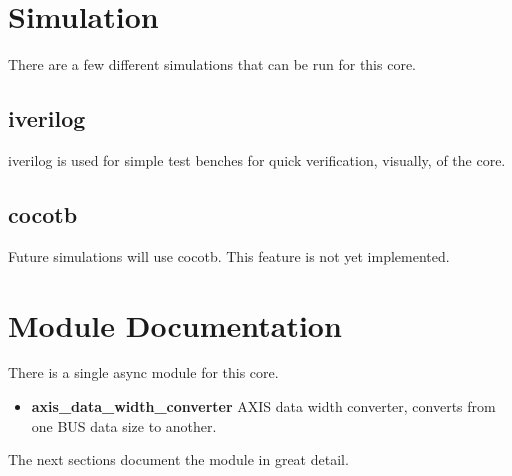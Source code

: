 \newpage

\section{Simulation}
\par
There are a few different simulations that can be run for this core.

\subsection{iverilog}
\par
iverilog is used for simple test benches for quick verification, visually, of the core.

\subsection{cocotb}
\par
Future simulations will use cocotb. This feature is not yet implemented.

\newpage

\section{Module Documentation} \label{Module Documentation}

\par
There is a single async module for this core.

\begin{itemize}
\item \textbf{axis\_data\_width\_converter} AXIS data width converter, converts from one BUS data size to another.\\
\end{itemize}
The next sections document the module in great detail.

